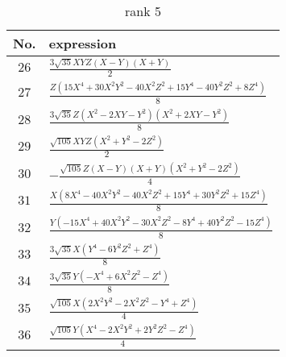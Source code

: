 \documentclass[fleqn,8pt,landscape]{jsarticle}
\begin{document}
\begin{table}[ht!]
\begin{center}
\caption{rank 5}
\renewcommand{\arraystretch}{1.3}
\begin{tabular}{cl} \hline \hline
No. & expression \\ \hline
$ 26 $ & $ \frac{3 \sqrt{35} X Y Z \left(X - Y\right) \left(X + Y\right)}{2} $ \\
$ 27 $ & $ \frac{Z \left(15 X^{4} + 30 X^{2} Y^{2} - 40 X^{2} Z^{2} + 15 Y^{4} - 40 Y^{2} Z^{2} + 8 Z^{4}\right)}{8} $ \\
$ 28 $ & $ \frac{3 \sqrt{35} Z \left(X^{2} - 2 X Y - Y^{2}\right) \left(X^{2} + 2 X Y - Y^{2}\right)}{8} $ \\
$ 29 $ & $ \frac{\sqrt{105} X Y Z \left(X^{2} + Y^{2} - 2 Z^{2}\right)}{2} $ \\
$ 30 $ & $ - \frac{\sqrt{105} Z \left(X - Y\right) \left(X + Y\right) \left(X^{2} + Y^{2} - 2 Z^{2}\right)}{4} $ \\
$ 31 $ & $ \frac{X \left(8 X^{4} - 40 X^{2} Y^{2} - 40 X^{2} Z^{2} + 15 Y^{4} + 30 Y^{2} Z^{2} + 15 Z^{4}\right)}{8} $ \\
$ 32 $ & $ \frac{Y \left(- 15 X^{4} + 40 X^{2} Y^{2} - 30 X^{2} Z^{2} - 8 Y^{4} + 40 Y^{2} Z^{2} - 15 Z^{4}\right)}{8} $ \\
$ 33 $ & $ \frac{3 \sqrt{35} X \left(Y^{4} - 6 Y^{2} Z^{2} + Z^{4}\right)}{8} $ \\
$ 34 $ & $ \frac{3 \sqrt{35} Y \left(- X^{4} + 6 X^{2} Z^{2} - Z^{4}\right)}{8} $ \\
$ 35 $ & $ \frac{\sqrt{105} X \left(2 X^{2} Y^{2} - 2 X^{2} Z^{2} - Y^{4} + Z^{4}\right)}{4} $ \\
$ 36 $ & $ \frac{\sqrt{105} Y \left(X^{4} - 2 X^{2} Y^{2} + 2 Y^{2} Z^{2} - Z^{4}\right)}{4} $ \\
 \hline \hline
\end{tabular}
\end{center}
\end{table}
\end{document}
